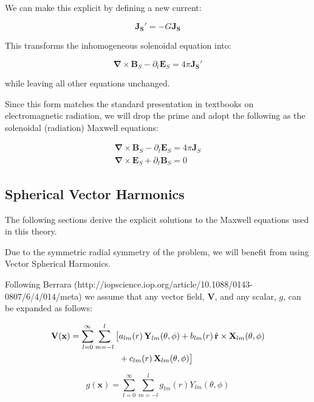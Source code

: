 \documentclass {article}
\renewcommand\vec{\mathbf}
\let\OldS\nabla
\renewcommand{\nabla}{\boldsymbol{\OldS}}
\let\OldHat\hat
\renewcommand{\hat}[1]{\OldHat{\mathbf{#1}}}
\begin{document}
We can make this explicit by defining a new current:


\begin{equation}
\vec {J_S'} = - G \vec {J_S}
\end{equation}

This transforms the inhomogeneous solenoidal equation into:

\begin{equation}
\nabla \times \vec B_S - \partial_t \vec E_S =  4 \pi \vec {J_S'}
\end{equation}

while leaving all other equations unchanged.

Since this form matches the standard presentation in textbooks on electromagnetic radiation, we will drop the prime and adopt the following as the solenoidal (radiation) Maxwell equations:

\begin{equation}
\begin{aligned}
\nabla \times \vec B_S - \partial_t \vec E_S =  4 \pi \vec J_S \\
\nabla \times \vec E_S + \partial_t \vec B_S = 0 
\end{aligned}
\end{equation}

\subsection{Spherical Vector Harmonics}

The following sections derive the explicit solutions to the Maxwell equations used in this theory.

Due to the symmetric radial symmetry of the problem, we will benefit from using Vector Spherical Harmonics. 

Following Berrara (http://iopscience.iop.org/article/10.1088/0143-0807/6/4/014/meta) we assume that any vector field, $\vec V$, and any scalar, $g$, can be expanded as follows:



\begin{align}
\vec{V}(\vec{x}) = \sum_{l=0}^{\infty} \sum_{m=-l}^{l} \big[ 
& a_{lm}(r)\, \vec{Y}_{lm}(\theta, \phi) 
+ b_{lm}(r)\, \hat{r} \times \vec{X}_{lm}(\theta, \phi) \notag \\
& + c_{lm}(r)\, \vec{X}_{lm}(\theta, \phi) 
\big]
\end{align}

\begin{equation}
g(\vec x) = \sum_{l=0}^{\infty} \sum_{m=-l}^{l} g_{lm}(r) Y_{lm}(\theta, \phi)
\end{equation}
\end{document}
